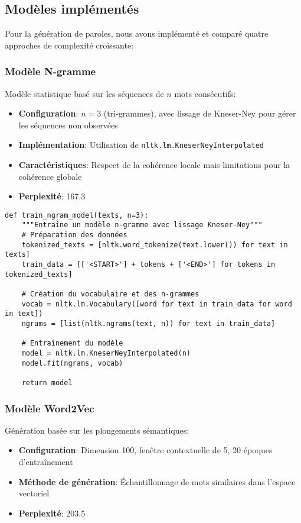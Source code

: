 \documentclass[a4paper,11pt]{article}
\begin{document}
\subsection{Modèles implémentés}
Pour la génération de paroles, nous avons implémenté et comparé quatre approches de complexité croissante:

\subsubsection{Modèle N-gramme}
Modèle statistique basé sur les séquences de $n$ mots consécutifs:
\begin{itemize}
    \item \textbf{Configuration}: $n=3$ (tri-grammes), avec lissage de Kneser-Ney pour gérer les séquences non observées
    \item \textbf{Implémentation}: Utilisation de \texttt{nltk.lm.KneserNeyInterpolated}
    \item \textbf{Caractéristiques}: Respect de la cohérence locale mais limitations pour la cohérence globale
    \item \textbf{Perplexité}: 167.3
\end{itemize}

\begin{lstlisting}[caption={Implémentation du générateur de texte N-gramme}, label=lst:ngram]
def train_ngram_model(texts, n=3):
    """Entraîne un modèle n-gramme avec lissage Kneser-Ney"""
    # Préparation des données
    tokenized_texts = [nltk.word_tokenize(text.lower()) for text in texts]
    train_data = [['<START>'] + tokens + ['<END>'] for tokens in tokenized_texts]
    
    # Création du vocabulaire et des n-grammes
    vocab = nltk.lm.Vocabulary([word for text in train_data for word in text])
    ngrams = [list(nltk.ngrams(text, n)) for text in train_data]
    
    # Entraînement du modèle
    model = nltk.lm.KneserNeyInterpolated(n)
    model.fit(ngrams, vocab)
    
    return model
\end{lstlisting}

\subsubsection{Modèle Word2Vec}
Génération basée sur les plongements sémantiques:
\begin{itemize}
    \item \textbf{Configuration}: Dimension 100, fenêtre contextuelle de 5, 20 époques d'entraînement
    \item \textbf{Méthode de génération}: Échantillonnage de mots similaires dans l'espace vectoriel
    \item \textbf{Perplexité}: 203.5
\end{itemize}
\end{document}
